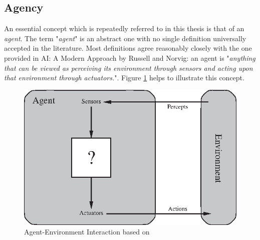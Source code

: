 
\subsection{Agency} \label{AgencySubsection}
An essential concept which is repeatedly referred to in this thesis is that of an \emph{agent}. The term "\textit{agent}" is an abstract one with no single definition universally accepted in the literature. Most definitions agree reasonably closely with the one provided in AI: A Modern Approach by Russell and Norvig: an agent is "\textit{anything that can be viewed as perceiving its environment through sensors and acting upon that environment through actuators.}"\cite{AIAMA}.  Figure \ref{fig:agent_env_interaction} helps to illustrate this concept. 
\begin{figure}
    \centering
    \includegraphics{Chapters/BackgroundKnowledgeAndRelatedWork/Figs/Vector/agent-environment.eps}
    \caption{Agent-Environment Interaction based on \cite[p.~35]{AIAMA}}
    \label{fig:agent_env_interaction}
\end{figure}
